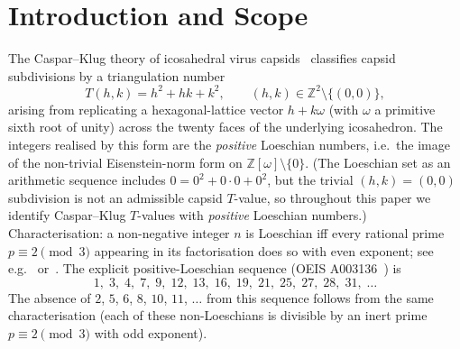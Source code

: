 \documentclass[12pt]{article}
\newcommand{\Tcasc}{\mathcal{T}_{\mathrm{casc}}}
\newcommand{\Zom}{\mathbb{Z}[\omega]}
\begin{document}
\begin{abstract}
Whether $\Tcasc$ is the face-level residue of a cell-level 600-cell
closure functional in the sense of Paper XXXII~\cite{SmartXXXII}
(pointwise) or the density-level closure form~\cite[\S F2]{CascadeFoundations}
(field) is left as an explicit open problem with a four-step plan of
attack. Two conjectural predictions for empirical capsid data are
flagged and will be tested in a follow-up note once a VIPERdb
observed-$T$ histogram is assembled. Every step is classified as
\textbf{derived} (proved), \textbf{identified} (structural
correspondence), or \textbf{open}, so the reader can locate exactly
where the chain rests on which type of support.
\end{abstract}

\section{Introduction and Scope}\label{sec:intro}

The Caspar--Klug theory of icosahedral virus capsids~\cite{CasparKlug}
classifies capsid subdivisions by a triangulation number
\[
    T(h, k) = h^2 + hk + k^2, \qquad (h, k) \in \mathbb{Z}^2 \setminus \{(0, 0)\},
\]
arising from replicating a hexagonal-lattice vector $h + k\omega$
(with $\omega$ a primitive sixth root of unity) across the twenty
faces of the underlying icosahedron. The integers realised by this
form are the \emph{positive} Loeschian numbers, i.e.\ the image
of the non-trivial Eisenstein-norm form on $\Zom\setminus\{0\}$.
(The Loeschian set as an arithmetic sequence includes $0 = 0^2 +
0\cdot 0 + 0^2$, but the trivial $(h, k) = (0, 0)$ subdivision is
not an admissible capsid $T$-value, so throughout this paper we
identify Caspar--Klug $T$-values with \emph{positive} Loeschian
numbers.) Characterisation: a non-negative integer $n$ is
Loeschian iff every rational prime $p \equiv 2 \pmod 3$ appearing
in its factorisation does so with even exponent; see
e.g.~\cite[Ch.\,15]{HardyWright} or~\cite[Ch.\,4]{ConwaySloane}.
The explicit positive-Loeschian sequence (OEIS A003136~\cite{OEIS-A003136})
is
\[
    1,\; 3,\; 4,\; 7,\; 9,\; 12,\; 13,\; 16,\; 19,\; 21,\; 25,\; 27,\; 28,\; 31,\;\ldots
\]
The absence of $2$, $5$, $6$, $8$, $10$, $11$, $\ldots$ from this
sequence follows from the same characterisation (each of these
non-Loeschians is divisible by an inert prime $p \equiv 2 \pmod 3$
with odd exponent).
\end{document}
